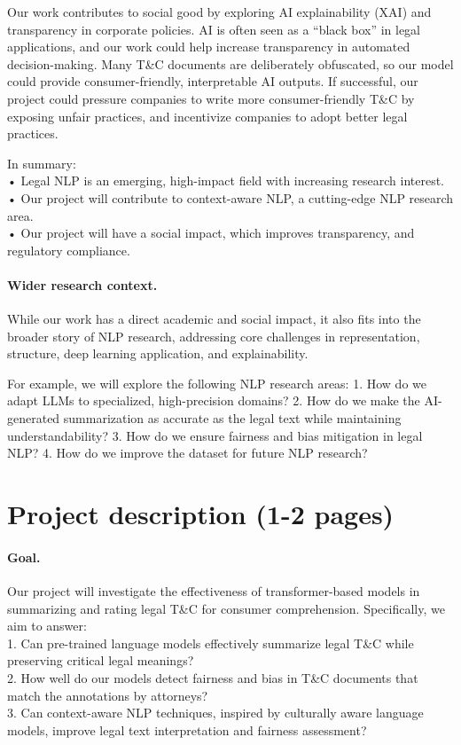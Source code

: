 \documentclass{article}
\begin{document}
Our work contributes to social good by exploring AI explainability (XAI) and transparency in corporate policies. AI is often seen as a “black box” in legal applications, and our work could help increase transparency in automated decision-making. Many T\&C documents are deliberately obfuscated, so our model could provide consumer-friendly, interpretable AI outputs. If successful, our project could pressure companies to write more consumer-friendly T\&C by exposing unfair practices, and incentivize companies to adopt better legal practices.

In summary:\\
	•	Legal NLP is an emerging, high-impact field with increasing research interest.\\
	•	Our project will contribute to context-aware NLP, a cutting-edge NLP research area.\\
	•	Our project will have a social impact, which improves transparency, and regulatory compliance.\\


\paragraph{Wider research context.}
While our work has a direct academic and social impact, it also fits into the broader story of NLP research, addressing core challenges in representation, structure, deep learning application, and explainability.

For example, we will explore the following NLP research areas:
1. How do we adapt LLMs to specialized, high-precision domains?
2. How do we make the AI-generated summarization as accurate as the legal text while maintaining understandability?
3. How do we ensure fairness and bias mitigation in legal NLP?
4. How do we improve the dataset for future NLP research?

\section{Project description (1-2 pages)}

\paragraph{Goal.} 
Our project will investigate the effectiveness of transformer-based models in summarizing and rating legal T\&C for consumer comprehension. Specifically, we aim to answer:\\
	1.	Can pre-trained language models effectively summarize legal T\&C while preserving critical legal meanings? \\
    2. How well do our models detect fairness and bias in T\&C documents that match the annotations by attorneys? \\
    3. Can context-aware NLP techniques, inspired by culturally aware language models, improve legal text interpretation and fairness assessment? \\
\end{document}
